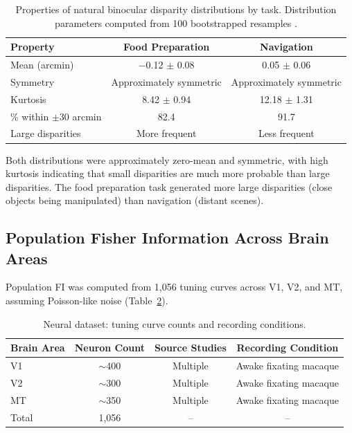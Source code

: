 \documentclass[11pt]{article}
\begin{document}
\begin{table}[H]
\centering
\caption{Properties of natural binocular disparity distributions by task. Distribution parameters computed from 100 bootstrapped resamples \citep{bootstrap_efron1979}.}
\label{tab:disparity_stats}
\begin{tabular}{lcc}
\toprule
Property & Food Preparation & Navigation \\
\midrule
Mean (arcmin) & $-$0.12 $\pm$ 0.08 & 0.05 $\pm$ 0.06 \\
Symmetry & Approximately symmetric & Approximately symmetric \\
Kurtosis & 8.42 $\pm$ 0.94 & 12.18 $\pm$ 1.31 \\
\% within $\pm$30 arcmin & 82.4 & 91.7 \\
Large disparities & More frequent & Less frequent \\
\bottomrule
\end{tabular}
\end{table}

Both distributions were approximately zero-mean and symmetric, with high kurtosis indicating that small disparities are much more probable than large disparities. The food preparation task generated more large disparities (close objects being manipulated) than navigation (distant scenes).

\subsection{Population Fisher Information Across Brain Areas}

Population FI was computed from 1,056 tuning curves across V1, V2, and MT, assuming Poisson-like noise \citep{poisson_noise2009} (Table~\ref{tab:neuron_counts}).

\begin{table}[H]
\centering
\caption{Neural dataset: tuning curve counts and recording conditions.}
\label{tab:neuron_counts}
\begin{tabular}{lccc}
\toprule
Brain Area & Neuron Count & Source Studies & Recording Condition \\
\midrule
V1 & $\sim$400 & Multiple & Awake fixating macaque \\
V2 & $\sim$300 & Multiple & Awake fixating macaque \\
MT & $\sim$350 & Multiple & Awake fixating macaque \\
Total & 1,056 & -- & -- \\
\bottomrule
\end{tabular}
\end{table}
\end{document}
